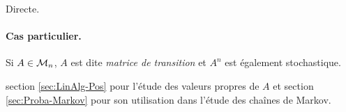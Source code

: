 \proof Directe. \eproof

\paragraph{Cas particulier.} Si $A \in \mathcal{M}_n$, $A$ est dite \emph{matrice de transition} et $A^n$ est également stochastique.

\remark section \ref{sec:LinAlg-Pos} pour l'étude des valeurs propres de $A$ et section \ref{sec:Proba-Markov} pour son utilisation dans l'étude des chaînes de Markov.
